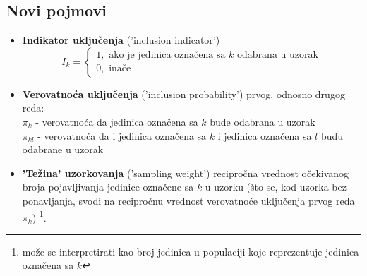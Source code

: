 \documentclass[10pt,a4paper,]{article}
\begin{document}
\subsection{Novi pojmovi}
\begin{itemize}
	\item \textbf{Indikator uključenja} ('inclusion indicator')
	\begin{equation}
		I_k = \begin{cases}
		1, \text{  ako je jedinica označena sa } k \text{ odabrana u uzorak} \\
		0, \text{  inače}
		\end{cases}
	\end{equation}
	\item \textbf{Verovatnoća uključenja} ('inclusion probability') 
	prvog, odnosno drugog reda:\\
	$\pi_k$ - verovatnoća da jedinica označena sa $k$ bude odabrana u uzorak\\
	$\pi_{kl}$ - verovatnoća da i jedinica označena sa $k$ i jedinica označena sa $l$ budu 
	odabrane u uzorak
	\item \textbf{'Težina' uzorkovanja} ('sampling weight')
	recipročna vrednost očekivanog broja pojavljivanja jedinice označene sa $k$ u uzorku
	(što 
	se, kod uzorka bez ponavljanja, svodi na recipročnu vrednost verovatnoće uključenja 
	prvog reda $\pi_k$) \footnote{može se interpretirati kao broj jedinica u populaciji 
	koje reprezentuje jedinica označena sa $k$}.
	
\end{itemize}
\end{document}
